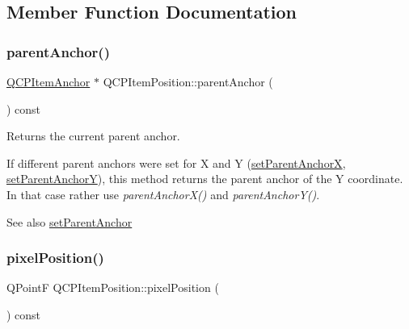 \subsection{Member Function Documentation}
\mbox{\label{class_q_c_p_item_position_a0a87f9dce1af6cc9b510785991bcf1c6}} 
\subsubsection{\texorpdfstring{parent\+Anchor()}{parentAnchor()}}
{\footnotesize\ttfamily \mbox{\hyperlink{class_q_c_p_item_anchor}{Q\+C\+P\+Item\+Anchor}} $\ast$ Q\+C\+P\+Item\+Position\+::parent\+Anchor (\begin{DoxyParamCaption}{ }\end{DoxyParamCaption}) const\hspace{0.3cm}{\ttfamily [inline]}}

Returns the current parent anchor.

If different parent anchors were set for X and Y (\mbox{\hyperlink{class_q_c_p_item_position_add71461a973927c74e42179480916d9c}{set\+Parent\+AnchorX}}, \mbox{\hyperlink{class_q_c_p_item_position_add5ec1db9d19cec58a3b5c9e0a0c3f9d}{set\+Parent\+AnchorY}}), this method returns the parent anchor of the Y coordinate. In that case rather use {\itshape parent\+Anchor\+X()} and {\itshape parent\+Anchor\+Y()}.

\begin{DoxySeeAlso}{See also}
\mbox{\hyperlink{class_q_c_p_item_position_ac094d67a95d2dceafa0d50b9db3a7e51}{set\+Parent\+Anchor}} 
\end{DoxySeeAlso}
\mbox{\label{class_q_c_p_item_position_a3b5a12a8e5081c1a5bb878ffdcfa92ad}} 
\subsubsection{\texorpdfstring{pixel\+Position()}{pixelPosition()}}
{\footnotesize\ttfamily Q\+PointF Q\+C\+P\+Item\+Position\+::pixel\+Position (\begin{DoxyParamCaption}{ }\end{DoxyParamCaption}) const\hspace{0.3cm}{\ttfamily [virtual]}}

